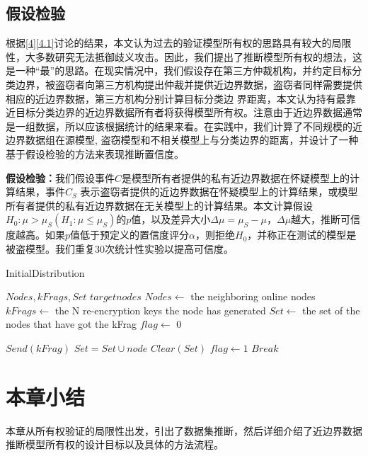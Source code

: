 \subsection{假设检验}\label{4.2.3}

根据\ref{4}\ref{4.1}讨论的结果，本文认为过去的验证模型所有权的思路具有较大的局限性，大多数研究无法抵御歧义攻击。因此，我们提出了推断模型所有权的想法，这是一种“最”的思路。在现实情况中，我们假设存在第三方仲裁机构，并约定目标分类边界，被盗窃者向第三方机构提出仲裁并提供近边界数据，盗窃者同样需要提供相应的近边界数据，第三方机构分别计算目标分类边
界距离，本文认为持有最靠近目标分类边界的近边界数据所有者将获得模型所有权。注意由于近边界数据通常是一组数据，所以应该根据统计的结果来看。在实践中，我们计算了不同规模的近边界数据组在源模型, 盗窃模型和不相关模型上与分类边界的距离，并设计了一种基于假设检验的方法来表现推断置信度。

\noindent\textbf{假设检验：}我们假设事件$C$是模型所有者提供的私有近边界数据在怀疑模型上的计算结果，事件$C_S$ 表示盗窃者提供的近边界数据在怀疑模型上的计算结果，或模型所有者提供的私有近边界数据在无关模型上的计算结果。本文计算假设$H_0:\mu > \mu_S(H_1:\mu\leq\mu_S)$的$p$值，以及差异大小$\Delta \mu = \mu_S - \mu$，$\Delta\mu$越大，推断可信度越高。如果$p$值低于预定义的置信度评分$\alpha$，则拒绝$H_0$，并称正在测试的模型是被盗模型。我们重复30次统计性实验以提高可信度。


\begin{algorithm}[htbp]
	\caption{InitialDistribution}
	\label{alg:1}
	\begin{algorithmic}[1]
		
		\Require $Nodes,kFrags,Set$
		\Ensure $targetnodes$
		\State $Nodes \gets$ the neighboring online nodes
		\State $kFrags \gets$ the N re-encryption keys the node has generated
		\State $Set \gets$ the set of the nodes that have got the kFrag
		\State $flag \gets$ 0
		\State
		\State {}
		\EndIf
		\State {}
		\EndIf
		\EndFor
		
		
		\State    
		\State $Send(kFrag)$
		\State $Set=Set \cup node$
		\State $Clear(Set)$
		\EndIf
		\State $flag \gets 1$
		\State $Break$
		
		
		\EndIf
		\EndFor
		\EndFunction
		
		
	\end{algorithmic}
\end{algorithm}

\section{本章小结}

本章从所有权验证的局限性出发，引出了数据集推断，然后详细介绍了近边界数据推断模型所有权的设计目标以及具体的方法流程。

